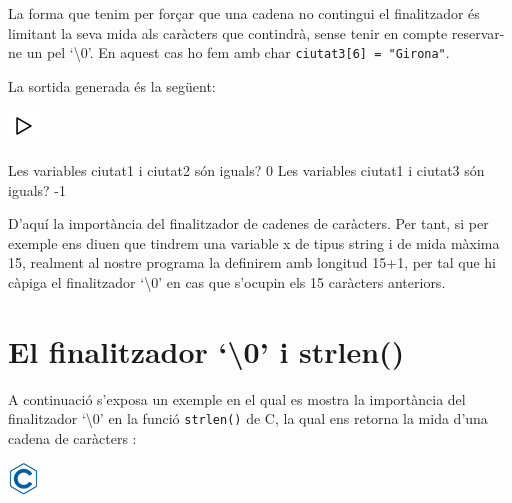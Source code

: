 \documentclass[]{book}
\newenvironment{Shaded}{\begin{snugshade}}{\end{snugshade}}
\newcommand{\DecValTok}[1]{\textcolor[rgb]{0.00,0.00,0.81}{#1}}
\newcommand{\NormalTok}[1]{#1}
\begin{document}
La forma que tenim per forçar que una cadena no contingui el
finalitzador és limitant la seva mida als caràcters que contindrà, sense
tenir en compte reservar-ne un pel `\textbackslash{}0'. En aquest cas ho
fem amb char \texttt{ciutat3{[}6{]}\ =\ "Girona"}.

La sortida generada és la següent:

\includegraphics{./img/play.png}

\begin{Shaded}
\begin{Highlighting}[]
\NormalTok{Les variables ciutat1 i ciutat2 són iguals? }\DecValTok{0}
\NormalTok{Les variables ciutat1 i ciutat3 són iguals? -}\DecValTok{1}
\end{Highlighting}
\end{Shaded}

D'aquí la importància del finalitzador de cadenes de caràcters. Per
tant, si per exemple ens diuen que tindrem una variable x de tipus
string i de mida màxima 15, realment al nostre programa la definirem amb
longitud 15+1, per tal que hi càpiga el finalitzador `\textbackslash{}0'
en cas que s'ocupin els 15 caràcters anteriors.

\section{\texorpdfstring{El finalitzador `\textbackslash{}0' i
strlen()}{El finalitzador \textbackslash{}0 i strlen()}}\label{el-finalitzador-0-i-strlen}

A continuació s'exposa un exemple en el qual es mostra la importància
del finalitzador `\textbackslash{}0' en la funció \texttt{strlen()} de
C, la qual ens retorna la mida d'una cadena de caràcters :

\includegraphics{./img/c.png}
\end{document}
